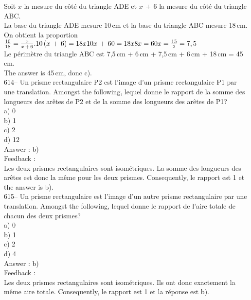 ﻿\documentclass[letterpaper, 12pt]{article}
\begin{document}
Soit $x$ la mesure du c\^ot\'e du triangle ADE et $x\,+\,6$ la mesure du
c\^ot\'e du triangle ABC.  \\
La base du triangle ADE mesure 10\,cm et la base du triangle ABC mesure
18\,cm.\\[2mm]
On obtient la proportion $\frac{10}{18}=\frac{x}{x\,+\,6}.\\[2mm]
10\left( x\,+\,6\right) =18x\\[2mm]
10x\,+\,60=18x\\[2mm]
8x=60\\[2mm]
x=\frac{15}{2}=7,5$\\[2mm]
Le p\'erim\`etre du triangle ABC est 7,5\,cm + 6\,cm + 7,5\,cm + 6\,cm +
18\,cm = 45\,cm.\\[2mm]
The answer is 45\,cm, donc c).\\

614-- Un prisme rectangulaire P2 est l'image d'un prisme rectangulaire P1
par une translation.  Amongst the following, lequel donne le
rapport de la somme des longueurs des ar\^etes de P2 et de la somme des
longueurs des ar\^etes de P1?\\
a) 0\\
b) 1\\
c) 2\\
d) 12\\

Answer : b)\\

Feedback : \\
Les deux prismes rectangulaires sont isom\'etriques.  La somme des longueurs
des ar\^etes est donc la m\^eme pour les deux prismes.  Consequently, le
rapport est 1 et the answer is b).\\

615-- Un prisme rectangulaire est l'image d'un autre prisme rectangulaire
par une translation.  Amongst the following, lequel donne le
rapport de l'aire totale de chacun des deux prismes?\\
a) 0\\
b) 1\\
c) 2\\
d) 4\\

Answer : b)\\

Feedback : \\
Les deux prismes rectangulaires sont isom\'etriques.  Ils ont donc
exactement la m\^eme aire totale.  Consequently, le rapport est 1 et la
r\'eponse est b).\\
\end{document}
